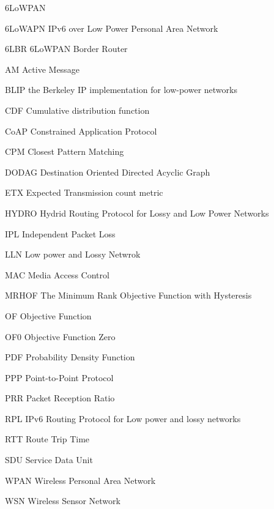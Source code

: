 \label{cha:abkuerzungen}

{\small
\begin{deflist}{6LoWPAN}
\raggedright
\item [6LoWAPN]      IPv6 over Low Power Personal Area Network
\item [6LBR]         6LoWPAN Border Router
\item [AM]           Active Message
\item [BLIP]         the Berkeley IP implementation for low-power networks
\item [CDF]          Cumulative distribution function
\item [CoAP]         Constrained Application Protocol
\item [CPM]          Closest Pattern Matching
\item [DODAG]        Destination Oriented Directed Acyclic Graph
\item [ETX]          Expected Transmission count metric 
\item [HYDRO]        Hydrid Routing Protocol for Lossy and Low Power Networks
\item [IPL]          Independent Packet Loss
\item [LLN]          Low power and Lossy Netwrok
\item [MAC]          Media Access Control
\item [MRHOF]        The Minimum Rank Objective Function with Hysteresis  
\item [OF]           Objective Function
\item [OF0]          Objective Function Zero
\item [PDF]          Probability Density Function
\item [PPP]          Point-to-Point Protocol
\item [PRR]          Packet Reception Ratio
\item [RPL]          IPv6 Routing Protocol for Low power and lossy networks
\item [RTT]          Route Trip Time
\item [SDU]          Service Data Unit
\item [WPAN]         Wireless Personal Area Network   
\item [WSN]          Wireless Sensor Network


      
\end{deflist}
}

